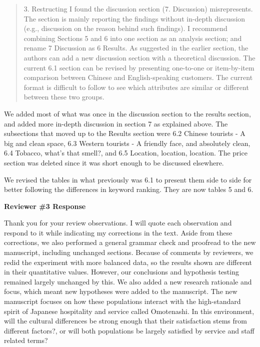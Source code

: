 \documentclass{letter}
\begin{document}
\begin{quotation}
3. Restructing
I found the discussion section (7. Discussion) misrepresents. The section is mainly reporting the findings without in-depth discussion (e.g., discussion on the reason behind such findings). I recommend combining Sections 5 and 6 into one section as an analysis section; and rename 7 Discussion as 6 Results. As suggested in the earlier section, the authors can add a new discussion section with a theoretical discussion.
The current 6.1 section can be revised by presenting one-to-one or item-by-item comparison between Chinese and English-speaking customers. The current format is difficult to follow to see which attributes are similar or different between these two groups.
\end{quotation}

We added most of what was once in the discussion section to the results section, and added more in-depth discussion in section 7 as explained above. The subsections that moved up to the Results section were 6.2 Chinese tourists - A big and clean space, 6.3 Western tourists - A friendly face, and absolutely clean, 6.4 Tobacco, what’s that smell?, and 6.5 Location, location, location. The price section was deleted since it was short enough to be discussed elsewhere.

We revised the tables in what previously was 6.1 to present them side to side for better following the differences in keyword ranking. They are now tables 5 and 6.


\clearpage
\textbf{Reviewer \#3 Response}

Thank you for your review observations. I will quote each observation and respond to it while indicating my corrections in the text.
Aside from these corrections, we also performed a general grammar check and proofread to the new manuscript, including unchanged sections. Because of comments by reviewers, we redid the experiment with more balanced data, so the results shown are different in their quantitative values. However, our conclusions and hypothesis testing remained largely unchanged by this. We also added a new research rationale and focus, which meant new hypotheses were added to the manuscript. The new manuscript focuses on how these populations interact with the high-standard spirit of Japanese hospitality and service called Omotenashi. In this environment, will the cultural differences be strong enough that their satisfaction stems from different factors?, or will both populations be largely satisfied by service and staff related terms?
\end{document}
